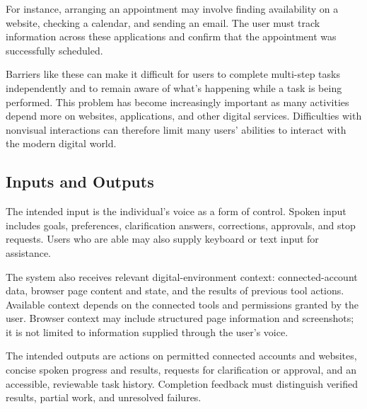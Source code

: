 \documentclass[11pt]{article}
\begin{document}
For instance, arranging an appointment may involve finding availability on a website, checking a calendar, and sending an email.
The user must track information across these applications and confirm that the appointment was successfully scheduled.

Barriers like these can make it difficult for users to complete multi-step tasks independently and
to remain aware of what's happening while a task is being performed. This problem has become increasingly
important as many activities depend more on websites, applications, and other digital services.
Difficulties with nonvisual interactions can therefore limit many users' abilities to interact with
the modern digital world.

\subsection{Inputs and Outputs}
The intended input is the individual's voice as a form of control.
Spoken input includes goals, preferences, clarification answers,
corrections, approvals, and stop requests. Users who are able may also supply
keyboard or text input for assistance.

The system also receives relevant digital-environment context: connected-account
data, browser page content and state, and the results of previous tool actions.
Available context depends on the connected tools and permissions granted by
the user. Browser context may include structured page information and screenshots;
it is not limited to information supplied through the user's voice.

The intended outputs are actions on permitted connected accounts and websites,
concise spoken progress and results, requests for clarification or
approval, and an accessible, reviewable task history. Completion feedback
must distinguish verified results, partial work, and unresolved failures.
\end{document}
